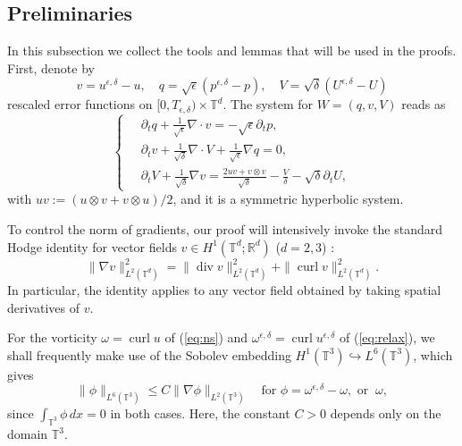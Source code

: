 \documentclass[reqno,10pt]{amsart}
\theoremstyle{definition}
\theoremstyle{remark}
\numberwithin{equation}{section}
\DeclareMathOperator{\dive}{div}
\DeclareMathOperator{\curl}{curl}
\begin{document}
\subsection{Preliminaries}
In this subsection we collect the tools and lemmas that will be used in the proofs.
First, denote by
\begin{equation} \label{eq:res_def}
        v = u^{\epsilon,\delta}-u, \quad q=\sqrt\epsilon(p^{\epsilon,\delta}-p), \quad V=\sqrt\delta(U^{\epsilon,\delta}-U)
\end{equation}
rescaled error functions on $[0,T_{\epsilon,\delta})\times \mathbb T^d$. The system for $W=(q,v,V)$ reads as
\begin{equation} \label{eq:res}
    \left \{ \
    \begin{aligned}
    &\partial_t q + \frac{1}{\sqrt\epsilon} \nabla \cdot v = -\sqrt \epsilon \partial_t p, \\
    &\partial_t v + \frac{1}{\sqrt\delta} \nabla \cdot V + \frac{1}{\sqrt\epsilon} \nabla q = 0, \\
    &\partial_t V + \frac{1}{\sqrt\delta}\nabla v = \frac{2u v + v\otimes v}{\sqrt\delta} - \frac{V}{\delta} - \sqrt \delta \partial_t U,
    \end{aligned}
    \right.
\end{equation}
with $uv := (u\otimes v+v\otimes u)/2$, and it is a symmetric hyperbolic system.

To control the norm of gradients, our proof will intensively invoke the standard Hodge identity for vector fields $v\in H^1(\mathbb T^d;\mathbb R^d)$ ($d=2,3$) \cite{temam2001ns}:
\begin{equation} \label{eq:hodge}
    \|\nabla v\|_{L^2(\mathbb T^d)}^2 = \|\dive v\|_{L^2(\mathbb T^d)}^2 + \|\curl v\|_{L^2(\mathbb T^d)}^2.
\end{equation}
In particular, the identity applies to any vector field obtained by taking spatial derivatives of $v$.

For the vorticity $\omega=\curl u$ of (\ref{eq:ns}) and $\omega^{\epsilon,\delta}=\curl u^{\epsilon,\delta}$ of (\ref{eq:relax}), we shall frequently make use of the Sobolev embedding $H^1(\mathbb T^3)\hookrightarrow L^6(\mathbb T^3)$, which gives 
\begin{equation} \label{eq:sob_emb}
    \|\phi\|_{L^6(\mathbb T^3)}\le C\|\nabla\phi\|_{L^2(\mathbb T^3)} \quad \text{for  } \phi=\omega^{\epsilon,\delta}-\omega, \text{ or } \ \omega,
\end{equation} 
since $\int_{\mathbb T^3} \phi\,dx=0$ in both cases. Here, the constant $C>0$ depends only on the domain $\mathbb T^3$.
\end{document}

